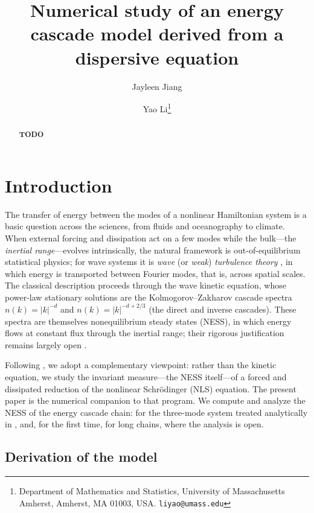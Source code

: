 \documentclass[11pt,a4paper]{article}
\title{Numerical study of an energy cascade model derived from a dispersive equation}
\author{Jayleen Jiang \and Yao Li\thanks{Department of Mathematics and Statistics, University of Massachusetts Amherst, Amherst, MA 01003, USA. \texttt{liyao@umass.edu}}}
\date{}
\theoremstyle{definition}
\numberwithin{equation}{section}   %
\begin{document}
\maketitle

\begin{abstract}
    \textbf{TODO}
\end{abstract}

\section{Introduction}

The transfer of energy between the modes of a nonlinear Hamiltonian system is a
basic question across the sciences, from fluids and oceanography to climate.
When external forcing and dissipation act on a few modes while the bulk---the
\emph{inertial range}---evolves intrinsically, the natural framework is
out-of-equilibrium statistical physics; for wave systems it is \emph{wave} (or
\emph{weak}) \emph{turbulence theory} \cite{Nazarenko}, in which energy is
transported between Fourier modes, that is, across spatial scales. The classical
description proceeds through the wave kinetic equation, whose power-law
stationary solutions are the Kolmogorov--Zakharov cascade spectra
$n(k)=|k|^{-d}$ and $n(k)=|k|^{-d+2/3}$ (the direct and inverse cascades). These
spectra are themselves nonequilibrium steady states (NESS), in which energy
flows at constant flux through the inertial range; their rigorous justification
remains largely open \cite{HLNS}.

Following \cite{HLNS}, we adopt a complementary viewpoint: rather than the
kinetic equation, we study the invariant measure---the NESS itself---of a
forced and dissipated reduction of the nonlinear Schr\"odinger (NLS) equation.
The present paper is the numerical companion to that program. We compute and
analyze the NESS of the energy cascade chain: for the three-mode system treated
analytically in \cite{HLNS}, and, for the first time, for long chains, where the
analysis is open.

\subsection{Derivation of the model}\label{sec:derivation}
\end{document}
